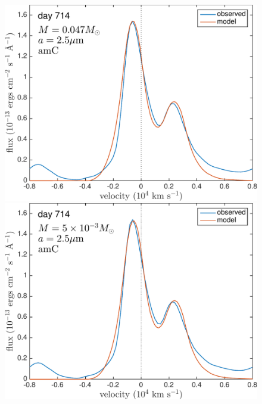 \begin{figure}
\includegraphics[trim =0 20 0 0,clip=true,scale=0.33]{chapters/chapter5/images/silicates_take2/OI/AmC_Dwek.pdf}
\hspace{3mm}
\includegraphics[trim =0 20 0 -25,clip=true,scale=0.33]{chapters/chapter5/images/silicates_take2/OI/AmC_bestfit.pdf}


\end{figure}
